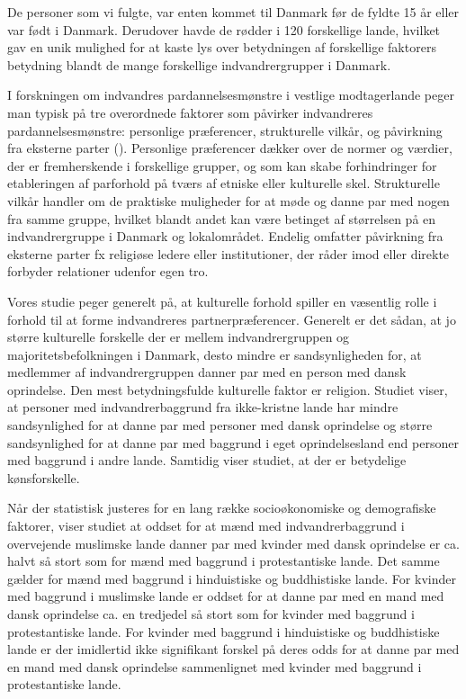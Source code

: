 \documentclass[
]{book}
\begin{document}
De personer som vi fulgte, var enten kommet til Danmark før de fyldte 15 år eller var født i Danmark. Derudover havde de rødder i 120 forskellige lande, hvilket gav en unik mulighed for at kaste lys over betydningen af forskellige faktorers betydning blandt de mange forskellige indvandrergrupper i Danmark.

I forskningen om indvandres pardannelsesmønstre i vestlige modtagerlande peger man typisk på tre overordnede faktorer som påvirker indvandreres pardannelsesmønstre: personlige præferencer, strukturelle vilkår, og påvirkning fra eksterne parter (). Personlige præferencer dækker over de normer og værdier, der er fremherskende i forskellige grupper, og som kan skabe forhindringer for etableringen af parforhold på tværs af etniske eller kulturelle skel. Strukturelle vilkår handler om de praktiske muligheder for at møde og danne par med nogen fra samme gruppe, hvilket blandt andet kan være betinget af størrelsen på en indvandrergruppe i Danmark og lokalområdet. Endelig omfatter påvirkning fra eksterne parter fx religiøse ledere eller institutioner, der råder imod eller direkte forbyder relationer udenfor egen tro.

Vores studie peger generelt på, at kulturelle forhold spiller en væsentlig rolle i forhold til at forme indvandreres partnerpræferencer. Generelt er det sådan, at jo større kulturelle forskelle der er mellem indvandrergruppen og majoritetsbefolkningen i Danmark, desto mindre er sandsynligheden for, at medlemmer af indvandrergruppen danner par med en person med dansk oprindelse. Den mest betydningsfulde kulturelle faktor er religion. Studiet viser, at personer med indvandrerbaggrund fra ikke-kristne lande har mindre sandsynlighed for at danne par med personer med dansk oprindelse og større sandsynlighed for at danne par med baggrund i eget oprindelsesland end personer med baggrund i andre lande. Samtidig viser studiet, at der er betydelige kønsforskelle.

Når der statistisk justeres for en lang række socioøkonomiske og demografiske faktorer, viser studiet at oddset for at mænd med indvandrerbaggrund i overvejende muslimske lande danner par med kvinder med dansk oprindelse er ca. halvt så stort som for mænd med baggrund i protestantiske lande. Det samme gælder for mænd med baggrund i hinduistiske og buddhistiske lande. For kvinder med baggrund i muslimske lande er oddset for at danne par med en mand med dansk oprindelse ca. en tredjedel så stort som for kvinder med baggrund i protestantiske lande. For kvinder med baggrund i hinduistiske og buddhistiske lande er der imidlertid ikke signifikant forskel på deres odds for at danne par med en mand med dansk oprindelse sammenlignet med kvinder med baggrund i protestantiske lande.
\end{document}
